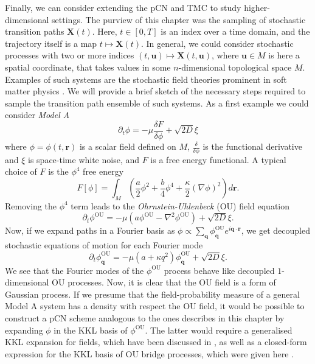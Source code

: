 Finally, we can consider extending the pCN and TMC to study higher-dimensional settings. The purview of this chapter was the sampling of stochastic transition paths $\mathbf{X}(t)$. Here, $t \in [0, T]$ is an index over a time domain, and the trajectory itself is a map $t \mapsto \mathbf{X}(t)$. In general, we could consider stochastic processes with two or more indices $(t, \mathbf{u}) \mapsto \mathbf{X}(t, \mathbf{u})$, where $\mathbf{u} \in M$ is here a spatial coordinate, that takes values in some $n$-dimensional topological space $M$. Examples of such systems are the stochastic field theories prominent in soft matter physics   \citep{catesTheoriesBinaryFluid2018, tiribocchiActiveModelScalar2015, stenhammarContinuumTheoryPhase2013, wittkowskiScalarF4Field2014, deanLangevinEquationDensity1996}. We will provide a brief sketch of the necessary steps required to sample the transition path ensemble of such systems. As a first example we could consider \textit{Model A} \citep{catesActiveFieldTheories2019}
\begin{equation}
	\partial_t \phi = - \mu \frac{\delta F}{\delta \phi} + \sqrt{2 D} \xi 
\end{equation}
where $\phi = \phi(t, \mathbf{r})$ is a scalar field defined on $M$, $\frac{\delta}{\delta \phi}$ is the functional derivative and $\xi$ is space-time white noise, and $F$ is a free energy functional. A typical choice of $F$ is the $\phi^4$ free energy
\begin{equation}
	F[\phi] = \int_M \left( \frac{a}{2} \phi^2 + \frac{b}{4} \phi^4 + \frac{\kappa}{2} (\nabla \phi)^2 \right) d \mathbf{r}.
\end{equation}
Removing the $\phi^4$ term leads to the \textit{Ohrnstein-Uhlenbeck} (OU) \citep{gardinerHandbookStochasticMethods1990} field equation
\begin{equation} \label{eq:OU process field}
	\partial_t \phi^\text{OU} = - \mu (a \phi^\text{OU} - \nabla^2 \phi^\text{OU}) + \sqrt{2D} \xi.
\end{equation}
Now, if we expand paths in a Fourier basis as $\phi \propto \sum_\mathbf{q} \phi^\text{OU}_\mathbf{q} e^{i \mathbf{q} \cdot \mathbf{r}}$, we get decoupled stochastic equations of motion for each Fourier mode
\begin{equation}
	\partial_t \phi^\text{OU}_\mathbf{q} = - \mu (a + \kappa q^2) \phi^\text{OU}_\mathbf{q} + \sqrt{2D} \xi.
\end{equation}
We see that the Fourier modes of the $\phi^\text{OU}$ process behave like decoupled $1$-dimensional OU processes. Now, it is clear that the OU field is a form of Gaussian process. If we presume that the field-probability measure of a general Model A system has a density with respect the OU field, it would be possible to construct a pCN scheme analogous to the ones describes in this chapter by expanding $\phi$ in the KKL basis of $\phi^\text{OU}$. The latter would require a generalised KKL expansion for fields, which have been discussed in \citep{wangKarhunenLoeveExpansionsTheir2008}, as well as a closed-form expression for the KKL basis of OU bridge processes, which were given here \citep{corlayPropertiesOrnsteinUhlenbeckBridge2014a}.




